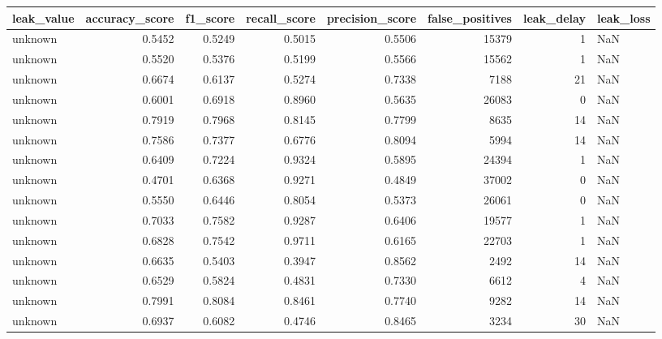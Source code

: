 \begin{tabular}{lrrrrrrl}
\toprule
leak\_value & accuracy\_score & f1\_score & recall\_score & precision\_score & false\_positives & leak\_delay & leak\_loss \\
\midrule
unknown & 0.5452 & 0.5249 & 0.5015 & 0.5506 & 15379 & 1 & NaN \\
unknown & 0.5520 & 0.5376 & 0.5199 & 0.5566 & 15562 & 1 & NaN \\
unknown & 0.6674 & 0.6137 & 0.5274 & 0.7338 & 7188 & 21 & NaN \\
unknown & 0.6001 & 0.6918 & 0.8960 & 0.5635 & 26083 & 0 & NaN \\
unknown & 0.7919 & 0.7968 & 0.8145 & 0.7799 & 8635 & 14 & NaN \\
unknown & 0.7586 & 0.7377 & 0.6776 & 0.8094 & 5994 & 14 & NaN \\
unknown & 0.6409 & 0.7224 & 0.9324 & 0.5895 & 24394 & 1 & NaN \\
unknown & 0.4701 & 0.6368 & 0.9271 & 0.4849 & 37002 & 0 & NaN \\
unknown & 0.5550 & 0.6446 & 0.8054 & 0.5373 & 26061 & 0 & NaN \\
unknown & 0.7033 & 0.7582 & 0.9287 & 0.6406 & 19577 & 1 & NaN \\
unknown & 0.6828 & 0.7542 & 0.9711 & 0.6165 & 22703 & 1 & NaN \\
unknown & 0.6635 & 0.5403 & 0.3947 & 0.8562 & 2492 & 14 & NaN \\
unknown & 0.6529 & 0.5824 & 0.4831 & 0.7330 & 6612 & 4 & NaN \\
unknown & 0.7991 & 0.8084 & 0.8461 & 0.7740 & 9282 & 14 & NaN \\
unknown & 0.6937 & 0.6082 & 0.4746 & 0.8465 & 3234 & 30 & NaN \\
\bottomrule
\end{tabular}
